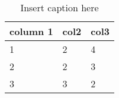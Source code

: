 \begin{table}
\begin{tabular}{l l l }
\hline
column 1&col2&col3
\\ 
\hline
1&2&4
\\ 
2&2&3
\\ 
3&3&2\\ 
\hline
\end{tabular}
\label{Insert label here}
\caption{Insert caption here}
\end{table}
